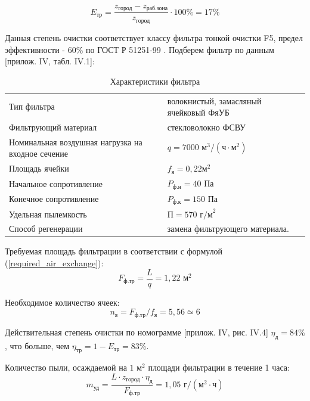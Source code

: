 $$
    E_\text{тр} = \frac{z_\text{город} - z_\text{раб.зона}}{z_\text{город}} \cdot 100 \% = 17 \%
$$

Данная степень очистки соответствует классу фильтра тонкой очистки F5, предел эффективности - 60\%
по ГОСТ Р 51251-99 \cite{ecology_gost_51251_99}.
Подберем фильтр по данным \cite{air_ventilation_and_conditioning}[прилож. IV, табл. IV.1]:

\begin{table}[ht]
    \centering
    \begin{tabular}{l|l}
        \hline
        Тип фильтра                                         & волокнистый, замасляный ячейковый ФяУБ            \\
        Фильтрующий материал                                & стекловолокно ФСВУ                                \\
        Номинальная воздушная нагрузка на входное сечение   & $q = 7000 \text{ м}^3/(\text{ч} \cdot \text{м}^2)$\\
        Площадь ячейки                                      & $f_\text{я} = 0,22 \text{м}^2 $                   \\
        Начальное сопротивление                             & $P_\text{ф.н} = 40 \text{ Па}$                    \\
        Конечное сопротивление                              & $P_\text{ф.к} = 150 \text{ Па}$                   \\
        Удельная пылемкость                                 & $\text{П} = 570 \text{ г/м}^2$                    \\
        Способ регенерации                                  & замена фильтрующего материала.                    \\
        \hline
    \end{tabular}
    \caption{Характеристики фильтра}
\end{table}

Требуемая площадь фильтрации в соответствии с формулой (\ref{required_air_exchange}):
$$
    F_\text{ф.тр} = \frac{L}{q} = 1,22 \text{ м}^2
$$

Необходимое количество ячеек:
$$
    n_\text{я} = F_\text{ф.тр} / f_\text{я} = 5,56
                \simeq 6
$$

Действительная степень очистки по номограмме
\cite{air_ventilation_and_conditioning}[прилож. IV, рис. IV.4] $\eta_\text{д} = 84 \%$, что
больше, чем $\eta_\text{тр} = 1 - E_\text{тр} = 83 \%$.

Количество пыли, осаждаемой на $1 \text{ м}^2$ площади фильтрации в течение 1 часа:
$$
    m_\text{уд} = \frac{L \cdot z_\text{город} \cdot \eta_\text{д}}{F_\text{ф.тр}}
            = 1,05 \text{ г/}(\text{м}^2 \cdot \text{ч})
$$


